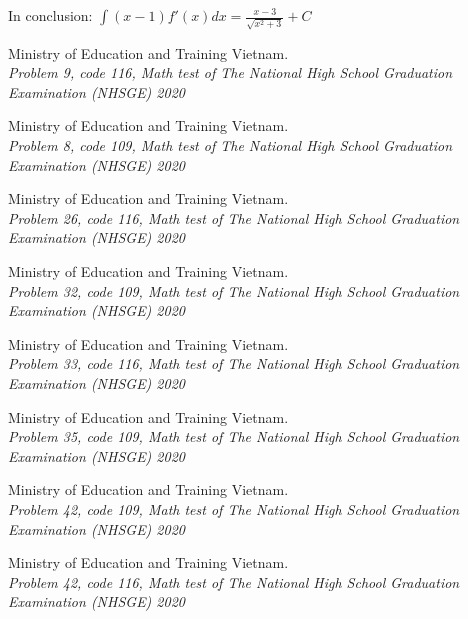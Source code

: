\documentclass{article}
\begin{document}
    In conclusion: $\displaystyle \int (x - 1)f'(x) dx = \frac{x - 3}{\sqrt{x^2 + 3}} + C$

    \begin{thebibliography}{10}
         Ministry of Education and Training Vietnam.\\
        \textit{Problem 9, code 116, Math test of The National High School Graduation Examination (NHSGE) 2020}

         Ministry of Education and Training Vietnam.\\
        \textit{Problem 8, code 109, Math test of The National High School Graduation Examination (NHSGE) 2020}

         Ministry of Education and Training Vietnam.\\
        \textit{Problem 26, code 116, Math test of The National High School Graduation Examination (NHSGE) 2020}

         Ministry of Education and Training Vietnam.\\
        \textit{Problem 32, code 109, Math test of The National High School Graduation Examination (NHSGE) 2020}

         Ministry of Education and Training Vietnam.\\
        \textit{Problem 33, code 116, Math test of The National High School Graduation Examination (NHSGE) 2020}

         Ministry of Education and Training Vietnam.\\
        \textit{Problem 35, code 109, Math test of The National High School Graduation Examination (NHSGE) 2020}

         Ministry of Education and Training Vietnam.\\
        \textit{Problem 42, code 109, Math test of The National High School Graduation Examination (NHSGE) 2020}

         Ministry of Education and Training Vietnam.\\
        \textit{Problem 42, code 116, Math test of The National High School Graduation Examination (NHSGE) 2020}
    \end{thebibliography}
\end{document}
